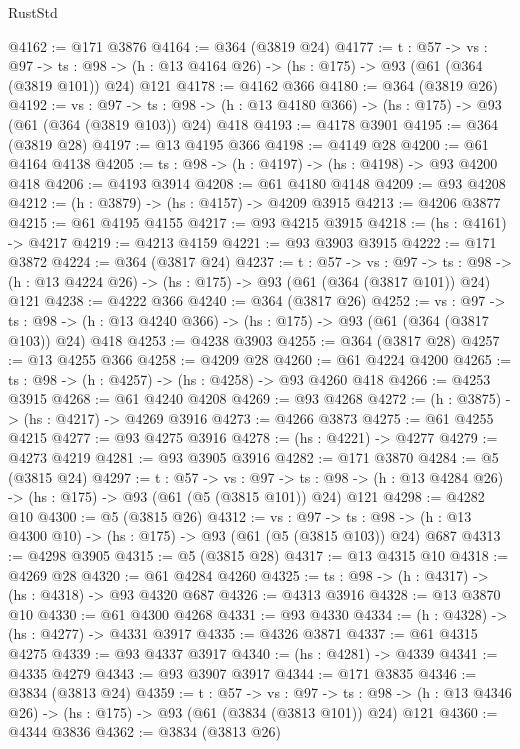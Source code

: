\begin{lexlean}{RustStd}
\begin{coremodule}
@4162 := @171 @3876
@4164 := @364 (@3819 @24)
@4177 := {t : @57} ->
  {vs : @97} ->
  {ts : @98} -> (h : @13 @4164 @26) -> (hs : @175) -> @93 (@61 (@364 (@3819 @101)) @24) @121
@4178 := @4162 @366
@4180 := @364 (@3819 @26)
@4192 := {vs : @97} ->
  {ts : @98} -> (h : @13 @4180 @366) -> (hs : @175) -> @93 (@61 (@364 (@3819 @103)) @24) @418
@4193 := @4178 @3901
@4195 := @364 (@3819 @28)
@4197 := @13 @4195 @366
@4198 := @4149 @28
@4200 := @61 @4164 @4138
@4205 := {ts : @98} -> (h : @4197) -> (hs : @4198) -> @93 @4200 @418
@4206 := @4193 @3914
@4208 := @61 @4180 @4148
@4209 := @93 @4208
@4212 := (h : @3879) -> (hs : @4157) -> @4209 @3915
@4213 := @4206 @3877
@4215 := @61 @4195 @4155
@4217 := @93 @4215 @3915
@4218 := (hs : @4161) -> @4217
@4219 := @4213 @4159
@4221 := @93 @3903 @3915
@4222 := @171 @3872
@4224 := @364 (@3817 @24)
@4237 := {t : @57} ->
  {vs : @97} ->
  {ts : @98} -> (h : @13 @4224 @26) -> (hs : @175) -> @93 (@61 (@364 (@3817 @101)) @24) @121
@4238 := @4222 @366
@4240 := @364 (@3817 @26)
@4252 := {vs : @97} ->
  {ts : @98} -> (h : @13 @4240 @366) -> (hs : @175) -> @93 (@61 (@364 (@3817 @103)) @24) @418
@4253 := @4238 @3903
@4255 := @364 (@3817 @28)
@4257 := @13 @4255 @366
@4258 := @4209 @28
@4260 := @61 @4224 @4200
@4265 := {ts : @98} -> (h : @4257) -> (hs : @4258) -> @93 @4260 @418
@4266 := @4253 @3915
@4268 := @61 @4240 @4208
@4269 := @93 @4268
@4272 := (h : @3875) -> (hs : @4217) -> @4269 @3916
@4273 := @4266 @3873
@4275 := @61 @4255 @4215
@4277 := @93 @4275 @3916
@4278 := (hs : @4221) -> @4277
@4279 := @4273 @4219
@4281 := @93 @3905 @3916
@4282 := @171 @3870
@4284 := @5 (@3815 @24)
@4297 := {t : @57} ->
  {vs : @97} ->
  {ts : @98} -> (h : @13 @4284 @26) -> (hs : @175) -> @93 (@61 (@5 (@3815 @101)) @24) @121
@4298 := @4282 @10
@4300 := @5 (@3815 @26)
@4312 := {vs : @97} ->
  {ts : @98} -> (h : @13 @4300 @10) -> (hs : @175) -> @93 (@61 (@5 (@3815 @103)) @24) @687
@4313 := @4298 @3905
@4315 := @5 (@3815 @28)
@4317 := @13 @4315 @10
@4318 := @4269 @28
@4320 := @61 @4284 @4260
@4325 := {ts : @98} -> (h : @4317) -> (hs : @4318) -> @93 @4320 @687
@4326 := @4313 @3916
@4328 := @13 @3870 @10
@4330 := @61 @4300 @4268
@4331 := @93 @4330
@4334 := (h : @4328) -> (hs : @4277) -> @4331 @3917
@4335 := @4326 @3871
@4337 := @61 @4315 @4275
@4339 := @93 @4337 @3917
@4340 := (hs : @4281) -> @4339
@4341 := @4335 @4279
@4343 := @93 @3907 @3917
@4344 := @171 @3835
@4346 := @3834 (@3813 @24)
@4359 := {t : @57} ->
  {vs : @97} ->
  {ts : @98} -> (h : @13 @4346 @26) -> (hs : @175) -> @93 (@61 (@3834 (@3813 @101)) @24) @121
@4360 := @4344 @3836
@4362 := @3834 (@3813 @26)

\end{coremodule}
\end{lexlean}
